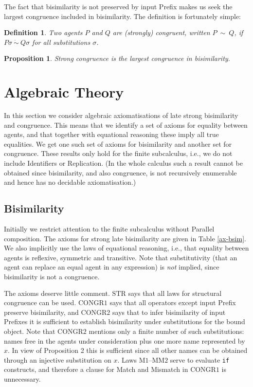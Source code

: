 \documentclass[10pt,a4paper]{article}
\newcommand{\rulname}[1]{\scriptstyle \text{#1}}
\newcommand{\bsim}{\:\dot{\sim}\:}
\newcommand{\congr}{\:\sim\:}
\newtheorem{theorem}{Proposition}
\newtheorem{definition}{Definition}
\begin{document}
The fact that bisimilarity is not preserved by input Prefix makes us seek the largest congruence included in bisimilarity. The definition is fortunately simple:

\begin{definition} \label{congruence}
Two agents $P$ and $Q$ are \textnormal{(strongly) congruent}, written $P \congr Q$, if $P\sigma \bsim Q\sigma$ for all substitutions $\sigma$.
\end{definition}

\begin{theorem}
Strong congruence is the largest congruence in bisimilarity.
\end{theorem}

\section{Algebraic Theory}

In this section we consider algebraic axiomatisations of late strong bisimilarity and congruence. This means that we identify a set of axioms for equality between agents, and that together with equational reasoning these imply all true equalities. We get one such set of axioms for bisimilarity and another set for congruence. These results only hold for the finite subcalculus, i.e., we do not include Identifiers or Replication. (In the whole calculus such a result cannot be obtained since bisimilarity, and also congruence, is not recursively enumerable and hence has no decidable axiomatisation.)

\subsection{Bisimilarity}

Initially we restrict attention to the finite subcalculus without Parallel composition. The axioms for strong late bisimilarity are given in Table \ref{ax-bsim}. We also implicitly use the laws of equational reasoning, i.e., that equality between agents is reflexive, symmetric and transitive. Note that substitutivity (that an agent can replace an equal agent in any expression) is \emph{not} implied, since bisimilarity is not a congruence.

The axioms deserve little comment. $\rulname{STR}$ says that all laws for structural congruence can be used. $\rulname{CONGR1}$ says that all operators except input Prefix preserve bisimilarity, and $\rulname{CONGR2}$ says that to infer bisimilarity of input Prefixes it is sufficient to establish bisimilarity under substitutions for the bound object. Note that $\rulname{CONGR2}$ mentions only a finite number of such substitutions: names free in the agents under consideration plus one more name represented by $x$. In view of Proposition 2 this is sufficient since all other names can be obtained through an injective substitution on $x$. Laws $\rulname{M1}$--$\rulname{MM2}$ serve to evaluate \texttt{if} constructs, and therefore a clause for Match and Mismatch in $\rulname{CONGR1}$ is unnecessary.
\end{document}
